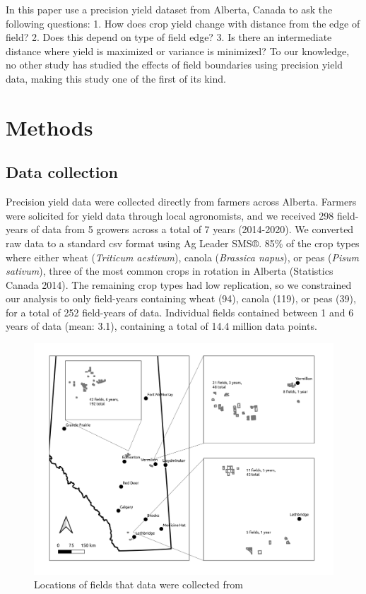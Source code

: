\documentclass[]{elsarticle} %
\begin{document}
In this paper use a precision yield dataset from Alberta, Canada to ask the following questions:
1. How does crop yield change with distance from the edge of field?
2. Does this depend on type of field edge?
3. Is there an intermediate distance where yield is maximized or variance is minimized?
To our knowledge, no other study has studied the effects of field boundaries using precision yield data, making this study one of the first of its kind.

\hypertarget{methods}{%
\section{Methods}\label{methods}}

\hypertarget{data-collection}{%
\subsection{Data collection}\label{data-collection}}

Precision yield data were collected directly from farmers across Alberta.
Farmers were solicited for yield data through local agronomists, and we received 298 field-years of data from 5 growers across a total of 7 years (2014-2020).
We converted raw data to a standard csv format using Ag Leader SMS®.
85\% of the crop types where either wheat (\emph{Triticum aestivum}), canola (\emph{Brassica napus}), or peas (\emph{Pisum sativum}), three of the most common crops in rotation in Alberta (Statistics Canada 2014).
The remaining crop types had low replication, so we constrained our analysis to only field-years containing wheat (94), canola (119), or peas (39), for a total of 252 field-years of data.
Individual fields contained between 1 and 6 years of data (mean: 3.1), containing a total of 14.4 million data points.

\begin{figure}
\includegraphics[width=1\linewidth]{../Figures/Field Locations} \caption{Locations of fields that data were collected from}\label{fig:fieldLocataions}
\end{figure}
\end{document}
